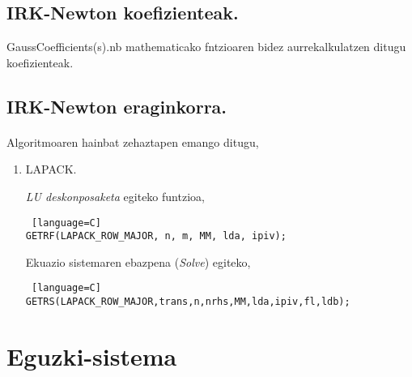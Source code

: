 \subsection{IRK-Newton koefizienteak.}

GaussCoefficients(s).nb mathematicako fntzioaren bidez aurrekalkulatzen ditugu koefizienteak.

\subsection{IRK-Newton eraginkorra.}

\paragraph*{} Algoritmoaren hainbat zehaztapen emango ditugu,

\begin{enumerate}

\item LAPACK.

\emph{LU deskonposaketa} egiteko funtzioa,
\begin{lstlisting} [language=C]
GETRF(LAPACK_ROW_MAJOR, n, m, MM, lda, ipiv);
\end{lstlisting}

Ekuazio sistemaren ebazpena (\emph{Solve}) egiteko,
\begin{lstlisting} [language=C]
GETRS(LAPACK_ROW_MAJOR,trans,n,nrhs,MM,lda,ipiv,fl,ldb);
\end{lstlisting}

\end{enumerate}

\section{Eguzki-sistema}

